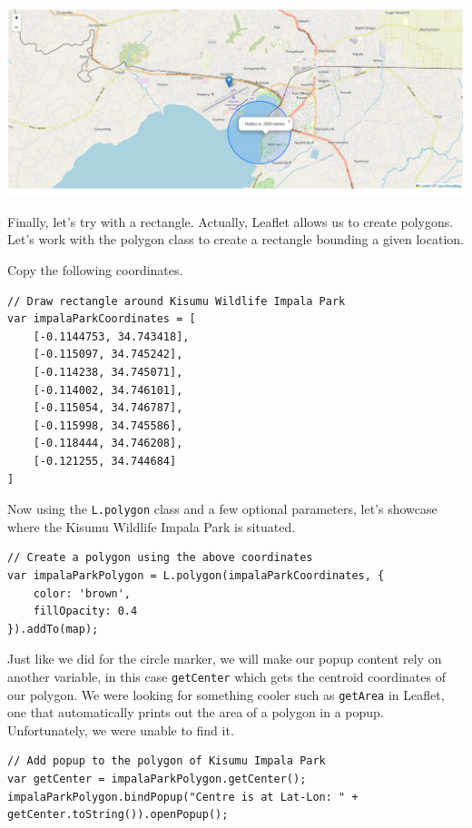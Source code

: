 \documentclass[
]{book}
\begin{document}
\includegraphics{../images/circle-radius.jpg}

Finally, let's try with a rectangle. Actually, Leaflet allows us to create polygons. Let's work with the polygon class to create a rectangle bounding a given location.

Copy the following coordinates.

\begin{verbatim}
// Draw rectangle around Kisumu Wildlife Impala Park
var impalaParkCoordinates = [
    [-0.1144753, 34.743418],
    [-0.115097, 34.745242],
    [-0.114238, 34.745071],
    [-0.114002, 34.746101],
    [-0.115054, 34.746787],
    [-0.115998, 34.745586],
    [-0.118444, 34.746208],
    [-0.121255, 34.744684]
]
\end{verbatim}

Now using the \texttt{L.polygon} class and a few optional parameters, let's showcase where the Kisumu Wildlife Impala Park is situated.

\begin{verbatim}
// Create a polygon using the above coordinates
var impalaParkPolygon = L.polygon(impalaParkCoordinates, {
    color: 'brown',
    fillOpacity: 0.4
}).addTo(map);
\end{verbatim}

Just like we did for the circle marker, we will make our popup content rely on another variable, in this case \texttt{getCenter} which gets the centroid coordinates of our polygon. We were looking for something cooler such as \texttt{getArea} in Leaflet, one that automatically prints out the area of a polygon in a popup. Unfortunately, we were unable to find it.

\begin{verbatim}
// Add popup to the polygon of Kisumu Impala Park
var getCenter = impalaParkPolygon.getCenter();
impalaParkPolygon.bindPopup("Centre is at Lat-Lon: " + getCenter.toString()).openPopup();
\end{verbatim}
\end{document}
